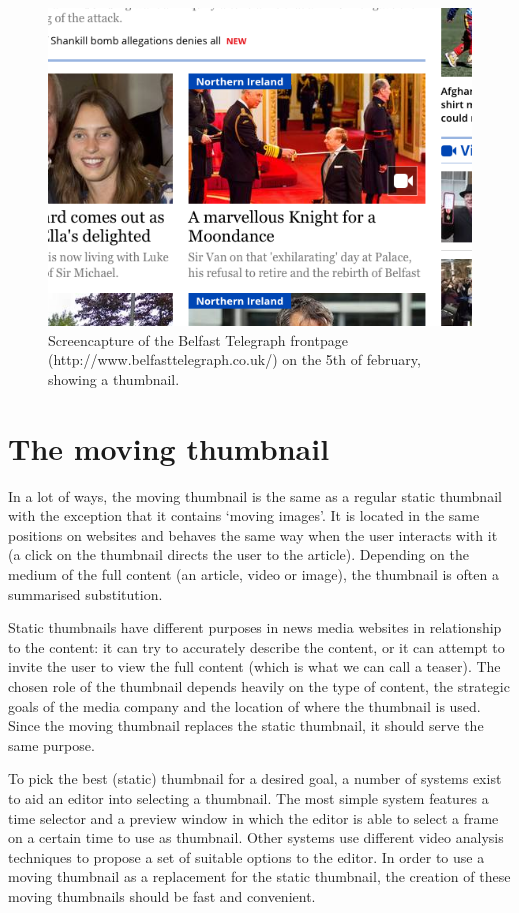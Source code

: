 \documentclass{../resources/acm_proc_article-sp}
\begin{document}
\begin{figure}[h]
  \includegraphics[width=\linewidth]{images/belfast-telegraph-thumbnail}
  \caption{Screencapture of the Belfast Telegraph frontpage (http://www.belfasttelegraph.co.uk/) on the 5th of february, showing a thumbnail.}
\end{figure}


\section{The moving thumbnail}

In a lot of ways, the moving thumbnail is the same as a regular static thumbnail with the exception that it contains `moving images'. It is located in the same positions on websites and behaves the same way when the user interacts with it (a click on the thumbnail directs the user to the article). Depending on the medium of the full content (an article, video or image), the thumbnail is often a summarised substitution.

Static thumbnails have different purposes in news media websites in relationship to the content: it can try to accurately describe the content, or it can attempt to invite the user to view the full content (which is what we can call a teaser). The chosen role of the thumbnail depends heavily on the type of content, the strategic goals of the media company and the location of where the thumbnail is used. Since the moving thumbnail replaces the static thumbnail, it should serve the same purpose.

To pick the best (static) thumbnail for a desired goal, a number of systems exist to aid an editor into selecting a thumbnail. The most simple system features a time selector and a preview window in which the editor is able to select a frame on a certain time to use as thumbnail. Other systems use different video analysis techniques to propose a set of suitable options to the editor. In order to use a moving thumbnail as a replacement for the static thumbnail, the creation of these moving thumbnails should be fast and convenient.
\end{document}
